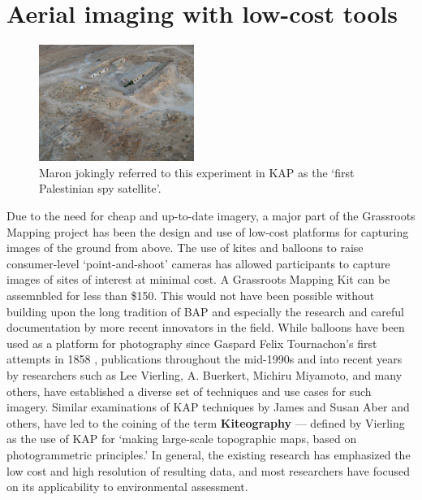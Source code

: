 \documentclass[11pt,oneside,notitlepage]{report}
\begin{document}
{{\section{Aerial imaging with low-cost tools}
\label{sec:aeriallowcost}

\begin{figure}
	\begin{flushright}
		\includegraphics[width=0.45\textwidth]{images/maron-spy-satellite.jpg}
		\caption{Maron jokingly referred to this experiment in \ac{KAP} as the `first Palestinian spy satellite'. \cite{maron2008former}}
	\end{flushright}
\end{figure}

Due to the need for cheap and up-to-date imagery, a major part of the Grassroots Mapping project has been the design and use of low-cost platforms for capturing images of the ground from above. The use of kites and balloons to raise consumer-level `point-and-shoot' cameras has allowed participants to capture images of sites of interest at minimal cost. A Grassroots Mapping Kit can be assemnbled for less than \$150. This would not have been possible without building upon the long tradition of \ac{BAP} and especially the research and careful documentation by more recent innovators in the field. While balloons have been used as a platform for photography since Gaspard Felix Tournachon's first attempts in 1858 \cite{vierling2006short}, publications throughout the mid-1990s and into recent years by researchers such as Lee Vierling, A. Buerkert, Michiru Miyamoto, and many others, have established a diverse set of techniques and use cases for such imagery. Similar examinations of \ac{KAP} techniques by James and Susan Aber and others, have led to the coining of the term \textbf{Kiteography} --- defined by Vierling as the use of \ac{KAP} for `making large-scale topographic maps, based on photogrammetric principles.' \cite{vierling2006short} In general, the existing research has emphasized the low cost and high resolution of resulting data, and most researchers have focused on its applicability to environmental assessment. \cite{aber1999kite}\cite{aber2002unmanned}\cite{miyamoto2004use}\cite{boike2003mapping}

}}
\end{document}
